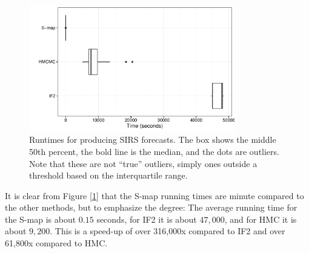     \begin{figure}
        \centering
        \captionsetup{width=.8\linewidth}
        \includegraphics[width=0.8\textwidth]{./images/timeplot.pdf}
        \caption{Runtimes for producing SIRS forecasts. The box shows the middle 50th percent, the bold line is the median, and the dots are outliers. Note that these are not ``true'' outliers, simply ones outside a threshold based on the interquartile range. \label{sirstimeplot}}
    \end{figure}

    It is clear from Figure [\ref{sirstimeplot}] that the S-map running times are minute compared to the other methods, but to emphasize the degree: The average running time for the S-map is about $0.15$ seconds, for IF2 it is about $47,000$, and for HMC it is about $9,200$. This is a speed-up of over 316,000x compared to IF2 and over 61,800x compared to HMC.
